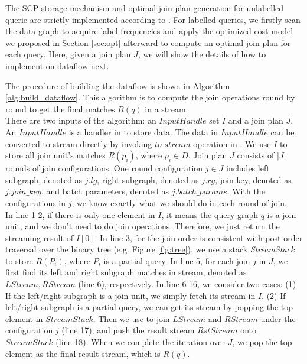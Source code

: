   The SCP storage mechanism and optimal join plan generation for unlabelled querie are strictly implemented according to \cite{Lai2016}. For labelled queries, we firstly scan the data graph to acquire label frequencies and apply the optimized cost model we proposed in Section \ref{sec:opt} afterward to compute an optimal join plan for each query. Here, given a join plan $J$, we will show the details of how to implement \gencliqjoin on \timely dataflow next. 

 The procedure of building the dataflow is shown in Algorithm \ref{alg:build_dataflow}. This algorithm is to compute the join operations round by round to get the final matches $R(q)$ in a stream.\\

There are two inputs of the algorithm: an $InputHandle$ set $I$ and a join plan $J$. An $InputHandle$ is a handler in \timely to store data. The data in $InputHandle$ can be converted to stream directly by invoking $to\_stream$ operation in \timely. We use $I$ to store all join unit's matches $R(p_i)$, where $p_i \in D$. Join plan $J$ consists of $|J|$ rounds of join configurations. One round configuration $j\in J$ includes left subgraph, denoted as $j.lg$, right subgraph, denoted as $j.rg$, join key, denoted as $j.join\_key$, and batch parameters, denoted as $j.batch\_params$. With the configurations in $j$, we know exactly what we should do in each round of join. \\

In line 1-2, if there is only one element in $I$, it means the query graph $q$ is a join unit, and we don't need to do join operations. Therefore, we just return the streaming result of $I[0]$. In line 3, for the join order is consistent with post-order traversal over the binary tree (e.g. Figure \ref{fig:tree}), we use a stack \textit{StreamStack} to store $R(P_i)$, where $P_i$ is a partial query. In line 5, for each join $j$ in $J$, we first find its left and right subgraph matches in stream, denoted as $LStream, RStream$ (line 6), respectively. In line 6-16, we consider two cases: (1) If the left/right subgraph is a join unit, we simply fetch its stream in $I$. (2) If left/right subgraph is a partial query, we can get its stream by popping the top element in $StreamStack$. Then we use  to join $LStream$ and $RStream$ under the configuration $j$ (line 17), and push the result stream $RstStream$ onto $StreamStack$ (line 18). When we complete the iteration over $J$, we pop the top element as the final result stream, which is $R(q)$.

